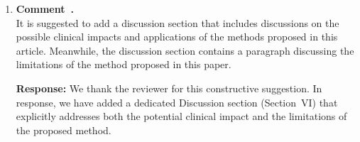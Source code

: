 \documentclass[11pt]{article}
\newcommand{\commentresponse}[2]{{\color{blue}\textbf{Response:} #2}}
\newcommand{\commentitem}{\item \textbf{Comment~\arabic{enumi}.}\\\ignorespaces}
\begin{document}
\begin{enumerate}
{{{    In particular, SMC-Net-S attains the best choroidal layer and vessel DSC while maintaining moderate model size and computational cost.
    Compared with the Transformer-based TACLNet~\cite{wen2024}, SMC-Net-S achieves comparable or better performance with approximately half the parameters and nearly one order of magnitude fewer GFLOPs.
    Moreover, performance gains saturate beyond SMC-Net-S (49.04M parameters), indicating diminishing returns from further model scaling.\\
    \textbf{2) Inference Time}\\
    We further evaluate inference efficiency on a single NVIDIA RTX 4090 D GPU (batch size 1, $512\times512$, fp32).
    SMC-Net-S processes one OCT image in 12.6~ms (approximately 79 FPS), demonstrating its suitability for real-time or near-real-time deployment. Table III reports the inference-time breakdown of the SMC-Net series, showing consistent scaling behavior across Tiny, Small, and Base variants.''}}   
    }

    \commentitem It is suggested to add a discussion section that includes discussions on the possible clinical impacts and applications of the methods proposed in this article. Meanwhile, the discussion section contains a paragraph discussing the limitations of the method proposed in this paper.
    
    \commentresponse{5}{
    We thank the reviewer for this constructive suggestion. In response, we have added a dedicated Discussion section (Section~VI) that explicitly addresses both the potential clinical impact and the limitations of the proposed method.

}
\end{enumerate}
\end{document}
